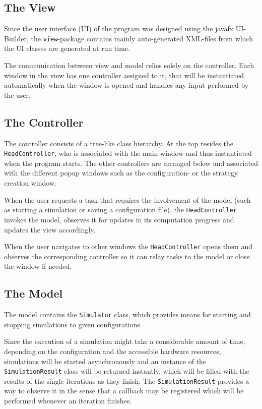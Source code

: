 \documentclass[parskip=full,11pt]{scrartcl}
\begin{document}
\subsection{The View}
Since the user interface (UI) of the program was designed using the javafx UI-Builder, the \texttt{view}-package contains mainly auto-generated XML-files from which the UI classes are generated at run time.

The communication between view and model relies solely on the controller. Each window in the view has one controller assigned to it, that will be instantiated automatically when the window is opened and handles any input performed by the user.

\subsection{The Controller}
The controller consists of a tree-like class hierarchy. At the top resides the \texttt{HeadController}, who is associated with the main window and thus instantiated when the program starts. The other controllers are arranged below and associated with the different popup windows such as the configuration- or the strategy creation window.

When the user requests a task that requires the involvement of the model (such as starting a simulation or saving a configuration file), the \texttt{HeadController} invokes the model, observes it for updates in its computation progress and updates the view accordingly.

When the user navigates to other windows the \texttt{HeadController} opens them and observes the corresponding controller so it can relay tasks to the model or close the window if needed.

\subsection{The Model}
The model contains the \texttt{Simulator} class, which provides means for starting and stopping simulations to given configurations.

Since the execution of a simulation might take a considerable amount of time, depending on the configuration and the accessible hardware resources, simulations will be started asynchronously and an instance of the \texttt{SimulationResult} class will be returned instantly, which will be filled with the results of the single iterations as they finish. The \texttt{SimulationResult} provides a way to observe it in the sense that a callback may be registered which will be performed whenever an iteration finishes.
\end{document}
